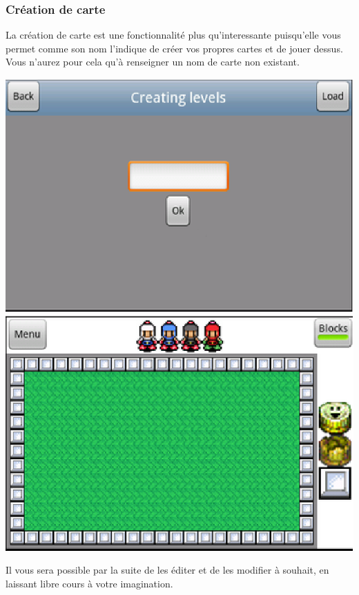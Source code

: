 	\subsubsection{Création de carte}
	La création de carte est une fonctionnalité plus qu'interessante puisqu'elle
	vous permet comme son nom l'indique de créer vos propres cartes et de jouer
	dessus. Vous n'aurez pour cela qu'à renseigner un nom de carte non existant. 
	\begin{center}						
			\includegraphics[scale=0.6]{Developpement/Img/10.eps}
			\includegraphics[scale=0.6]{Developpement/Img/11.eps}
		\end{center}
	Il vous sera possible par la suite de les éditer et de les modifier à souhait,
	en laissant libre cours à votre imagination.
	
	
